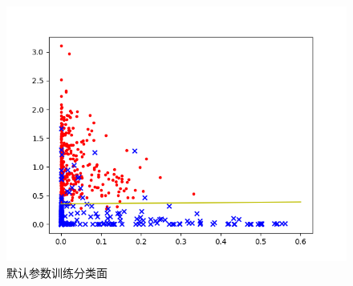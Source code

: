 \documentclass[a4paper]{article}
\begin{document}
\begin{figure}
    \centering
    \includegraphics[width=12cm]{Fig_4.png}
    \caption{默认参数训练分类面}
\end{figure}
\end{document}
